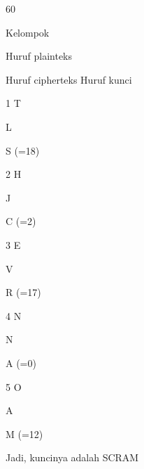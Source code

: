 \documentclass{article}
\begin{document}

60

Kelompok 

Huruf plainteks 

Huruf cipherteks        Huruf kunci

  1      T  

       L  



S (=18)

   2      H  

       J  



C (=2)

   3      E  

       V  



R (=17)

   4      N   

       N  



A (=0)

   5       O  

       A  



M (=12)

 Jadi, kuncinya adalah SCRAM
\end{document}
